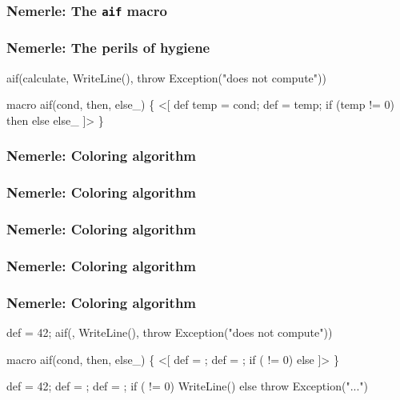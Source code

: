 \documentclass[hyperref={bookmarks=false}]{beamer}
\begin{document}
\begin{frame}[fragile]
\frametitle<1>{Nemerle: The \texttt{aif} macro}
\frametitle<2>{Nemerle: The perils of hygiene}
\begin{semiverbatim}
aif(calculate,
  WriteLine(),
  throw Exception("does not compute"))

macro aif(cond, then, else_) \{
  <[
    def temp = {\textdollar}cond;
    def  = temp;
    if (temp != 0) {\textdollar}then else {\textdollar}else_
  ]>
\}


\end{semiverbatim}
\end{frame}

\begin{frame}[fragile]
\frametitle<1>{Nemerle: Coloring algorithm}
\frametitle<2>{Nemerle: Coloring algorithm}%
\frametitle<3>{Nemerle: Coloring algorithm}%
\frametitle<4>{Nemerle: Coloring algorithm}%
\frametitle<5>{Nemerle: Coloring algorithm}%
\begin{semiverbatim}
def  = 42;                 
aif(,
  WriteLine(),
  throw Exception("does not compute"))

macro aif(cond, then, else_) \{      
  <[
    def  = ;
    def  = ;    
    if ( != 0)  else 
  ]>
\}

def  = 42;                 
def  = ;
def  = ;
if ( != 0) WriteLine() else throw Exception("...")
\end{semiverbatim}
\end{frame}
\end{document}
